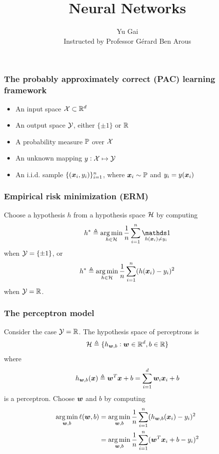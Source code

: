 \documentclass{beamer}
\title{Neural Networks}
\author{
    Yu Gai \\
    Instructed by Professor G\'erard Ben Arous
}
\DeclareMathOperator*{\argmin}{arg\,min}
\DeclareMathOperator{\ind}{{\mathds 1}}
\begin{document}
\frame{\titlepage}

\begin{frame}

\frametitle{The probably approximately correct (PAC) learning framework}

\begin{itemize}
\item An input space ${\mathcal X} \subset {\mathbb R}^d$
\item An output space ${\mathcal Y}$, either $\{\pm 1\}$ or ${\mathbb R}$
\item A probability measure ${\mathbb P}$ over ${\mathcal X}$
\item An unknown mapping $y: {\mathcal X} \mapsto {\mathcal Y}$
\item An i.i.d. sample $\{({\bm x}_i, y_i)\}_{i = 1}^n$, where ${\bm x}_i \sim {\mathbb P}$ and $y_i = y({\bm x}_i)$
\end{itemize}

\end{frame}

\begin{frame}

\frametitle{Empirical risk minimization (ERM)}

Choose a hypothesis $h$ from a hypothesis space ${\mathcal H}$ by computing
\[
h^* \triangleq \argmin_{h \in \calh} \frac1n \sum_{i = 1}^n \ind_{h(\bmx_i) \ne y_i}
\]
when ${\mathcal Y} = \{\pm 1\}$, or
\[
h^* \triangleq \argmin_{h \in \calh} \frac1n \sum_{i = 1}^n (h(\bmx_i) - y_i)^2
\]
when ${\mathcal Y} = {\mathbb R}$.

\end{frame}

\begin{frame}

\frametitle{The perceptron model}

Consider the case ${\mathcal Y} = {\mathbb R}$.
The hypothesis space of perceptrons is
\[
{\mathcal H} \triangleq \{h_{{\bm w}, b} : {\bm w} \in {\mathbb R}^d, b \in {\mathbb R}\}
\]
where
\[
h_{{\bm w}, b} ({\bm x})
\triangleq {\bm w}^T {\bm x} + b
= \sum_{i = 1}^d {\bm w}_i {\bm x}_i + b
\]
is a perceptron.
Choose ${\bm w}$ and $b$ by computing
\begin{align*}
\argmin_{\bmw, b} \ell (\bmw, b)
& = \argmin_{\bmw, b} \frac1n \sum_{i = 1}^n (h_{\bmw, b} (\bmx_i) - y_i)^2 \\
& = \argmin_{\bmw, b} \frac1n \sum_{i = 1}^n (\bmw^T \bmx_i + b - y_i)^2
\end{align*}

\end{frame}
\end{document}
